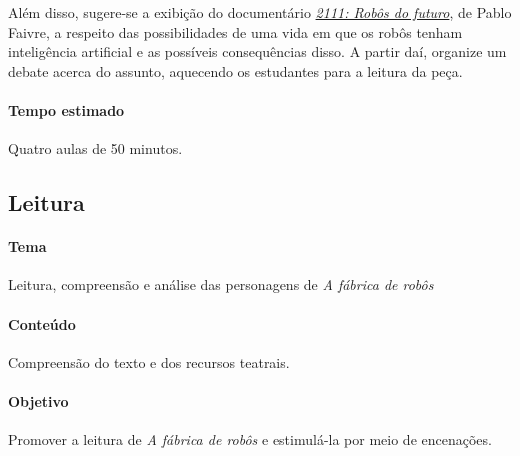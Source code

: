 \documentclass[11pt]{extarticle}
\begin{document}

Além disso, sugere-se a exibição do documentário \href{https://www.youtube.com/watch?v=gtUtczmJmO4}{\textit{2111: Robôs do futuro}}, de Pablo Faivre, a respeito das possibilidades de uma vida em que os robôs tenham inteligência artificial e as possíveis consequências disso. A partir daí, organize um debate acerca do assunto, aquecendo os estudantes para a leitura da peça.

\paragraph{Tempo estimado} Quatro aulas de 50 minutos. 

\subsection{Leitura}


\paragraph{Tema} Leitura, compreensão e análise das personagens de \textit{A fábrica de robôs}

\paragraph{Conteúdo} Compreensão do texto e dos recursos teatrais.

\paragraph{Objetivo} Promover a leitura de \textit{A fábrica de robôs} e estimulá-la por meio de encenações. 
\end{document}
